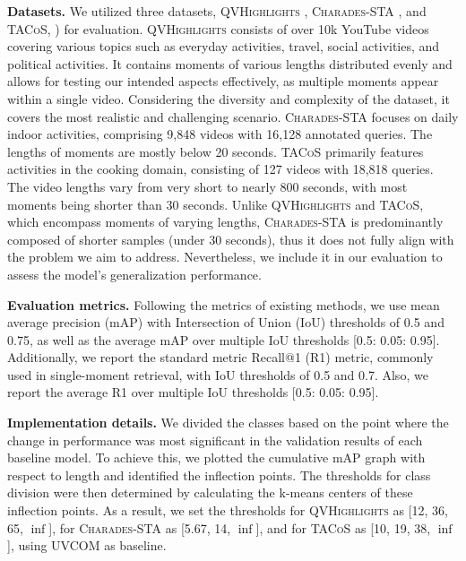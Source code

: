 \noindent\textbf{Datasets.}
We utilized three datasets, {\textsc{QVHighlights}} \cite{lei2021detecting_Moment-DETR}, \textsc{Charades-STA} \cite{gao2017tall_dataset_charades}, and \textsc{TACoS}, \cite{regneri2013grounding_dataset_tacos}) for evaluation.
\textsc{QVHighlights} consists of over 10k YouTube videos covering various topics such as everyday activities, travel, social activities, and political activities.
It contains moments of various lengths distributed evenly and allows for testing our intended aspects effectively, as multiple moments appear within a single video.
Considering the diversity and complexity of the dataset, it covers the most realistic and challenging scenario. 
\textsc{Charades-STA} focuses on daily indoor activities, comprising 9,848 videos with 16,128 annotated queries.
The lengths of moments are mostly below 20 seconds.
\textsc{TACoS} primarily features activities in the cooking domain, consisting of 127 videos with 18,818 queries.
The video lengths vary from very short to nearly 800 seconds, with most moments being shorter than 30 seconds.
Unlike \textsc{QVHighlights} and \textsc{TACoS}, which encompass moments of varying lengths, \textsc{Charades-STA} is predominantly composed of shorter samples (under 30 seconds), thus it does not fully align with the problem we aim to address. Nevertheless, we include it in our evaluation to assess the model's generalization performance.

\vspace{1mm}
\noindent\textbf{Evaluation metrics.}
Following the metrics of existing methods, we use mean average precision (mAP) with Intersection of Union (IoU) thresholds of 0.5 and 0.75, as well as the average mAP over multiple IoU thresholds [0.5: 0.05: 0.95].
Additionally, we report the standard metric Recall@1 (R1) metric, commonly used in single-moment retrieval, with IoU thresholds of 0.5 and 0.7. Also, we report the average R1 over multiple IoU thresholds [0.5: 0.05: 0.95].

\vspace{1mm}
\noindent\textbf{Implementation details.}
We divided the classes based on the point where the change in performance was most significant in the validation results of each baseline model. To achieve this, we plotted the cumulative mAP graph with respect to length and identified the inflection points.
The thresholds for class division were then determined by calculating the k-means centers of these inflection points.
As a result, we set the thresholds for \textsc{QVHighlights} as [12, 36, 65, \(\inf\)], for \textsc{Charades-STA} as [5.67, 14, \(\inf\)], and for \textsc{TACoS} as [10, 19, 38, \(\inf\)], using UVCOM as baseline.

